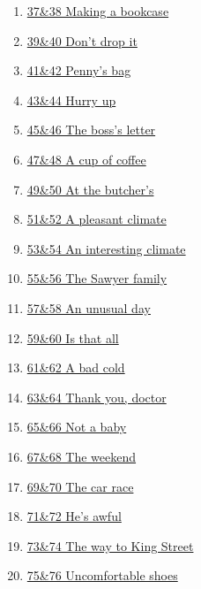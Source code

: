 \documentclass[11pt]{article}
\begin{document}
\begin{multicols}{2}
\begin{enumerate}
		\item \href{https://mp.weixin.qq.com/s/jU0zziZvNkN3smWyjcKZzw}{37\&38 Making a bookcase}	%
		\item \href{https://mp.weixin.qq.com/s/GAkeIdal7Qe3db1aJYdWuQ}{39\&40 Don't drop it}	%
		\item \href{https://mp.weixin.qq.com/s/2F9XLQUQILztcgf6yCW7jg}{41\&42 Penny's bag}	%
		\item \href{https://mp.weixin.qq.com/s/10YygqNtfcUOT9xAQ4uN1A}{43\&44 Hurry up}	%
		\item \href{https://mp.weixin.qq.com/s/aP9S0qy8NglSOoiGVdBarw}{45\&46 The boss's letter}	%
		\item \href{https://mp.weixin.qq.com/s/u6UzmTzHhB9UkkX8Akhe9Q}{47\&48 A cup of coffee}	%
		\item \href{https://mp.weixin.qq.com/s/jBJgj6PQWCHT0ZRPvcWbUw}{49\&50 At the butcher's}	%
		\item \href{https://mp.weixin.qq.com/s/wwJ46B0G5JcVihhCL0v0ig}{51\&52 A pleasant climate}	%
		\item \href{https://mp.weixin.qq.com/s/9EiXEfH0fVv3jVMqCK3sxg}{53\&54 An interesting climate}	%
		\item \href{https://mp.weixin.qq.com/s/9GNx8Mi37l2gNPFjG_VkQQ}{55\&56 The Sawyer family}	%
		\item \href{https://mp.weixin.qq.com/s/UPCiQJyVNSQxQW5unOyUAQ}{57\&58 An unusual day}	%
		\item \href{https://mp.weixin.qq.com/s/uqlkC7cgnGhyJjhJqo4pYQ}{59\&60 Is that all}	%
		\item \href{https://mp.weixin.qq.com/s/fhovF8hrkiXlvfWolxZKaw}{61\&62 A bad cold}	%
		\item \href{https://mp.weixin.qq.com/s/BArp8t6Uot_e1KkREOSJRA}{63\&64 Thank you, doctor}	%
		\item \href{https://mp.weixin.qq.com/s/njGrI95qXKYM0zeiQ2aXwA}{65\&66 Not a baby}	%
		\item \href{https://mp.weixin.qq.com/s/EPYRBjDVxktXv5qxw2X30A}{67\&68 The weekend}	%
		\item \href{https://mp.weixin.qq.com/s/tcW6AGPu8oN4AbC-H5Ihqg}{69\&70 The car race}	%
		\item \href{https://mp.weixin.qq.com/s/i8f2pRyjREXf7BN4EKHzzw}{71\&72 He's awful}	%
		\item \href{https://mp.weixin.qq.com/s/kwbPPJs4DUcYWjf3TJlwlw}{73\&74 The way to King Street}	%
		\item \href{https://mp.weixin.qq.com/s/YTjIhvQXaZZYd14qAsyu6A}{75\&76 Uncomfortable shoes}	%

\end{enumerate}
\end{multicols}
\end{document}
